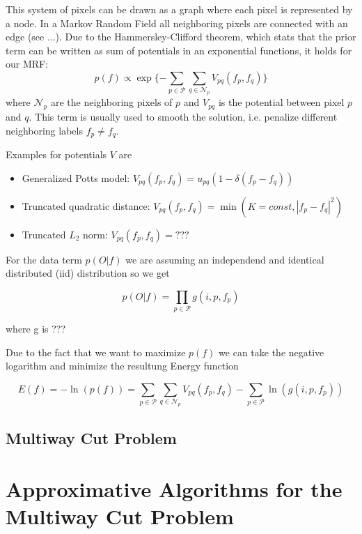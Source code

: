 \documentclass{scrartcl}[12pt, halfparskip]
\begin{document}
This system of pixels can be drawn as a graph where each pixel is represented by a node. In a Markov Random Field all neighboring pixels are connected with an edge (see ...). Due to the Hammersley-Clifford theorem, which stats that the prior term can be written as sum of potentials in an exponential functions, it holds for our MRF:
\begin{equation}
	p(f) \propto \exp\{ - \sum\limits_{p \in \mathcal{P}} \sum\limits_{q \in \mathcal{N}_p} V_{pq} (f_p, f_q) \}
\end{equation}
where $\mathcal{N}_p$ are the neighboring pixels of $p$ and $V_{pq}$ is the potential between pixel $p$ and $q$. This term is usually used to smooth the solution, i.e. penalize different neighboring labels $f_p \neq f_q$.

Examples for potentials $V$ are
\begin{itemize}
	\item Generalized Potts model: $V_{pq}(f_p, f_q) = u_{pq} (1 - \delta(f_p - f_q))$
	\item Truncated quadratic distance: $V_{pq}(f_p, f_q) = \min (K=const, |f_p - f_q|^2)$
	\item Truncated $L_2$ norm: $V_{pq}(f_p, f_q) = ???$
\end{itemize}

For the data term $p(O|f)$ we are assuming an independend and identical distributed (iid) distribution so we get

\begin{equation}
	p(O|f) = \prod\limits_{p \in \mathcal{P}} g(i, p, f_p)
\end{equation}

where g is ???

Due to the fact that we want to maximize $p(f)$ we can take the negative logarithm and minimize the resultung Energy function

\begin{equation}
E(f) = - \ln(p(f)) = \sum\limits_{p \in \mathcal{P}} \sum\limits_{q \in \mathcal{N}_p} V_{pq} (f_p, f_q) - \sum\limits_{p \in \mathcal{P}} \ln(g(i, p, f_p))
\end{equation}






\subsection{Multiway Cut Problem}

\section{Approximative Algorithms for the Multiway Cut Problem}
\end{document}
